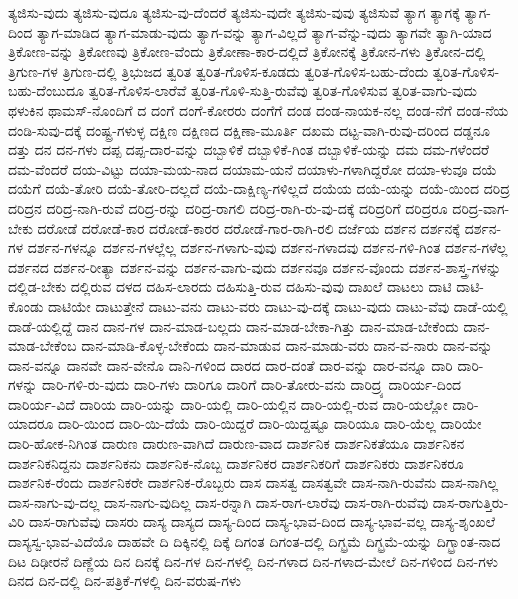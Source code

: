 {ತ್ಯಜಿಸು-ವುದು
ತ್ಯಜಿಸು-ವುದೂ
ತ್ಯಜಿಸು-ವು-ದೆಂದರೆ
ತ್ಯಜಿಸು-ವುದೇ
ತ್ಯಜಿಸು-ವುವು
ತ್ಯಜಿಸುವೆ
ತ್ಯಾಗ
ತ್ಯಾಗಕ್ಕೆ
ತ್ಯಾಗ-ದಿಂದ
ತ್ಯಾಗ-ಮಾಡಿದ
ತ್ಯಾಗ-ಮಾಡು-ವುದು
ತ್ಯಾಗ-ವನ್ನು
ತ್ಯಾಗ-ವಿಲ್ಲದೆ
ತ್ಯಾಗ-ವೆನ್ನು-ವುದು
ತ್ಯಾಗವೇ
ತ್ಯಾಗಿ-ಯಾದ
ತ್ರಿಕೋಣ-ವನ್ನು
ತ್ರಿಕೋಣವು
ತ್ರಿಕೋಣ-ವೆಂದು
ತ್ರಿಕೋಣಾ-ಕಾರ-ದಲ್ಲಿದೆ
ತ್ರಿಕೋನಕ್ಕೆ
ತ್ರಿಕೋನ-ಗಳು
ತ್ರಿಕೋನ-ದಲ್ಲಿ
ತ್ರಿಗುಣ-ಗಳ
ತ್ರಿಗುಣ-ದಲ್ಲಿ
ತ್ರಿಭುಜದ
ತ್ವರಿತ
ತ್ವರಿತ-ಗೊಳಿಸ-ಕೂಡದು
ತ್ವರಿತ-ಗೊಳಿಸ-ಬಹು-ದೆಂದು
ತ್ವರಿತ-ಗೊಳಿಸ-ಬಹು-ದೆಂಬುದೂ
ತ್ವರಿತ-ಗೊಳಿಸ-ಲಾರೆವೆ
ತ್ವರಿತ-ಗೊಳಿ-ಸುತ್ತಿ-ರುವೆವು
ತ್ವರಿತ-ಗೊಳಿಸುವ
ತ್ವರಿತ-ವಾಗು-ವುದು
ಥಳುಕಿನ
ಥಾಮಸ್-ನೊಂದಿಗೆ
ದ
ದಂಗೆ
ದಂಗೆ-ಕೋರರು
ದಂಗೆಗೆ
ದಂಡ
ದಂಡ-ನಾಯಕ-ನಲ್ಲ
ದಂಡ-ನೆಗೆ
ದಂಡ-ನೆಯ
ದಂಡಿ-ಸುವು-ದಕ್ಕೆ
ದಂಷ್ಟ್ರ-ಗಳುಳ್ಳ
ದಕ್ಷಿಣ
ದಕ್ಷಿಣದ
ದಕ್ಷಿಣಾ-ಮೂರ್ತಿ
ದಖಮ
ದಟ್ಟ-ವಾಗಿ-ರುವು-ದರಿಂದ
ದಡ್ಡನೂ
ದತ್ತು
ದನ
ದನ-ಗಳು
ದಪ್ಪ
ದಪ್ಪ-ದಾರ-ವನ್ನು
ದಬ್ಬಾಳಿಕೆ
ದಬ್ಬಾಳಿಕೆ-ಗಿಂತ
ದಬ್ಬಾಳಿಕೆ-ಯನ್ನು
ದಮ
ದಮ-ಗಳೆಂದರೆ
ದಮ-ವೆಂದರೆ
ದಯ-ವಿಟ್ಟು
ದಯಾ-ಮಯ-ನಾದ
ದಯಾಮ-ಯನೆ
ದಯಾಳು-ಗಳಾಗಿದ್ದರೋ
ದಯಾ-ಳುವೂ
ದಯೆ
ದಯೆಗೆ
ದಯೆ-ತೋರಿ
ದಯೆ-ತೋರಿ-ದಲ್ಲದೆ
ದಯೆ-ದಾಕ್ಷಿಣ್ಯ-ಗಳಿಲ್ಲದೆ
ದಯೆಯ
ದಯೆ-ಯನ್ನು
ದಯೆ-ಯಿಂದ
ದರಿದ್ರ
ದರಿದ್ರನ
ದರಿದ್ರ-ನಾಗಿ-ರುವೆ
ದರಿದ್ರ-ರನ್ನು
ದರಿದ್ರ-ರಾಗಲಿ
ದರಿದ್ರ-ರಾಗಿ-ರು-ವು-ದಕ್ಕೆ
ದರಿದ್ರರಿಗೆ
ದರಿದ್ರರೂ
ದರಿದ್ರ-ವಾಗ-ಬೇಕು
ದರೋಡೆ
ದರೋಡೆ-ಕಾರ
ದರೋಡೆ-ಕಾರರ
ದರೋಡೆ-ಗಾರ-ರಾಗಿ-ರಲಿ
ದರ್ಜೆಯ
ದರ್ಶನ
ದರ್ಶನಕ್ಕೆ
ದರ್ಶನ-ಗಳ
ದರ್ಶನ-ಗಳನ್ನೂ
ದರ್ಶನ-ಗಳಲ್ಲೆಲ್ಲ
ದರ್ಶನ-ಗಳಾಗು-ವುವು
ದರ್ಶನ-ಗಳಾದವು
ದರ್ಶನ-ಗಳಿ-ಗಿಂತ
ದರ್ಶನ-ಗಳೆಲ್ಲ
ದರ್ಶನದ
ದರ್ಶನ-ರೀತ್ಯಾ
ದರ್ಶನ-ವನ್ನು
ದರ್ಶನ-ವಾಗು-ವುದು
ದರ್ಶನವೂ
ದರ್ಶನ-ವೊಂದು
ದರ್ಶನ-ಶಾಸ್ತ್ರ-ಗಳನ್ನು
ದಲ್ಲಿಡ-ಬೇಕು
ದಲ್ಲಿರುವ
ದಳದ
ದಹಿಸ-ಲಾರದು
ದಹಿಸುತ್ತಿ-ರುವ
ದಹಿಸು-ವುವು
ದಾಖಲೆ
ದಾಟಲು
ದಾಟಿ
ದಾಟಿ-ಕೊಂಡು
ದಾಟಿಯೇ
ದಾಟುತ್ತೇನೆ
ದಾಟು-ವನು
ದಾಟು-ವರು
ದಾಟು-ವು-ದಕ್ಕೆ
ದಾಟು-ವುದು
ದಾಟು-ವೆವು
ದಾಡೆ-ಯಲ್ಲಿ
ದಾಡೆ-ಯಲ್ಲಿದ್ದೆ
ದಾನ
ದಾನ-ಗಳ
ದಾನ-ಮಾಡ-ಬಲ್ಲದು
ದಾನ-ಮಾಡ-ಬೇಕಾ-ಗಿತ್ತು
ದಾನ-ಮಾಡ-ಬೇಕೆಂದು
ದಾನ-ಮಾಡ-ಬೇಕೆಂಬ
ದಾನ-ಮಾಡಿ-ಕೊಳ್ಳ-ಬೇಕೆಂದು
ದಾನ-ಮಾಡುವ
ದಾನ-ಮಾಡು-ವರು
ದಾನ-ವ-ನಾರು
ದಾನ-ವನ್ನು
ದಾನ-ವನ್ನೂ
ದಾನವೇ
ದಾನ-ವೇನೊ
ದಾನಿ-ಗಳಿಂದ
ದಾರದ
ದಾರ-ದಂತೆ
ದಾರ-ವನ್ನು
ದಾರ-ವನ್ನೂ
ದಾರಿ
ದಾರಿ-ಗಳನ್ನು
ದಾರಿ-ಗಳಿ-ರು-ವುದು
ದಾರಿ-ಗಳು
ದಾರಿಗೂ
ದಾರಿಗೆ
ದಾರಿ-ತೋರು-ವನು
ದಾರಿದ್ರ್ಯ
ದಾರಿರ್ಯ-ದಿಂದ
ದಾರಿರ್ಯ-ವಿದೆ
ದಾರಿಯ
ದಾರಿ-ಯನ್ನು
ದಾರಿ-ಯಲ್ಲಿ
ದಾರಿ-ಯಲ್ಲಿನ
ದಾರಿ-ಯಲ್ಲಿ-ರುವ
ದಾರಿ-ಯಲ್ಲೋ
ದಾರಿ-ಯಾದರೂ
ದಾರಿ-ಯಿಂದ
ದಾರಿ-ಯಿ-ದೆಯೆ
ದಾರಿ-ಯಿದ್ದರೆ
ದಾರಿ-ಯಿದ್ದಷ್ಟೂ
ದಾರಿಯೂ
ದಾರಿ-ಯೆಲ್ಲ
ದಾರಿಯೇ
ದಾರಿ-ಹೋಕ-ನಿಗಿಂತ
ದಾರುಣ
ದಾರುಣ-ವಾಗಿದೆ
ದಾರುಣ-ವಾದ
ದಾರ್ಶನಿಕ
ದಾರ್ಶನಿಕತೆಯೂ
ದಾರ್ಶನಿಕನ
ದಾರ್ಶನಿಕನಿದ್ದನು
ದಾರ್ಶನಿಕನು
ದಾರ್ಶನಿಕ-ನೊಬ್ಬ
ದಾರ್ಶನಿಕರ
ದಾರ್ಶನಿಕರಿಗೆ
ದಾರ್ಶನಿಕರು
ದಾರ್ಶನಿಕರೂ
ದಾರ್ಶನಿಕ-ರೆಂದು
ದಾರ್ಶನಿಕರೇ
ದಾರ್ಶನಿಕ-ರೊಬ್ಬರು
ದಾಸ
ದಾಸತ್ವ
ದಾಸತ್ವವೇ
ದಾಸ-ನಾಗಿ-ರುವೆನು
ದಾಸ-ನಾಗಿಲ್ಲ
ದಾಸ-ನಾಗು-ವು-ದಲ್ಲ
ದಾಸ-ನಾಗು-ವುದಿಲ್ಲ
ದಾಸ-ರನ್ನಾಗಿ
ದಾಸ-ರಾಗ-ಲಾರೆವು
ದಾಸ-ರಾಗಿ-ರುವೆವು
ದಾಸ-ರಾಗುತ್ತಿರು-ವಿರಿ
ದಾಸ-ರಾಗುವೆವು
ದಾಸರು
ದಾಸ್ಯ
ದಾಸ್ಯದ
ದಾಸ್ಯ-ದಿಂದ
ದಾಸ್ಯ-ಭಾವ-ದಿಂದ
ದಾಸ್ಯ-ಭಾವ-ವಲ್ಲ
ದಾಸ್ಯ-ಶೃಂಖಲೆ
ದಾಸ್ಯಸ್ವ-ಭಾವ-ವಿದೆಯೊ
ದಾಹವೇ
ದಿ
ದಿಕ್ಕಿನಲ್ಲಿ
ದಿಕ್ಕೆ
ದಿಗಂತ
ದಿಗಂತ-ದಲ್ಲಿ
ದಿಗ್ಭ್ರಮೆ
ದಿಗ್ಭ್ರಮೆ-ಯನ್ನು
ದಿಗ್ಭ್ರಾಂತ-ನಾದ
ದಿಟ
ದಿಢೀರನೆ
ದಿಣ್ಣೆಯ
ದಿನ
ದಿನಕ್ಕೆ
ದಿನ-ಗಳ
ದಿನ-ಗಳಲ್ಲಿ
ದಿನ-ಗಳಾದ
ದಿನ-ಗಳಾದ-ಮೇಲೆ
ದಿನ-ಗಳಿಂದ
ದಿನ-ಗಳು
ದಿನದ
ದಿನ-ದಲ್ಲಿ
ದಿನ-ಪತ್ರಿಕೆ-ಗಳಲ್ಲಿ
ದಿನ-ವರುಷ-ಗಳು
}
